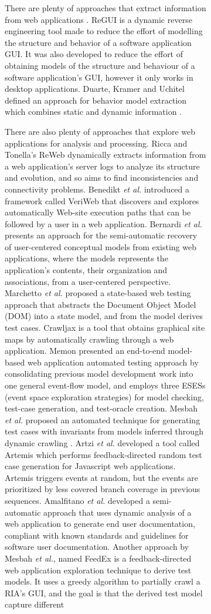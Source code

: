 \documentclass[conference]{IEEEtran}
\begin{document}
\begin{enumerate}
\begin{figure}[!htb]
\begin{itemize}
\begin{figure}[!htb]
\begin{itemize}
There are plenty of approaches that extract information from web applications \cite{sampath2007applying,amalfitano2010rich, andjelkovic2011trace,5556690,conf/fmics/PaivaFM07}. ReGUI \cite{coimbra2011reverse,coimbra2012dynamic} is a dynamic reverse engineering tool made to reduce the effort of modelling the structure and behavior of a software application GUI. It was also developed to reduce the effort of obtaining models of the structure and behaviour of a software application's GUI, however it only works in desktop applications.
Duarte, Kramer and Uchitel defined an approach for behavior model extraction which combines static and dynamic information \cite{duarte2006model}.

There are also plenty of approaches that explore web applications for analysis and processing. Ricca and Tonella's ReWeb \cite{ricca2001understanding} dynamically extracts information from a web application's server logs to analyze its structure and evolution, and so aims to find inconsistencies and connectivity problems. Benedikt \textit{et al.} introduced a framework called VeriWeb \cite{benedikt2002veriWeb} that discovers and explores automatically Web-site execution paths that can be followed by a user in a web application. Bernardi \textit{et al.} \cite{bernardi2008reverse} presents an approach for the semi-automatic recovery of user-centered conceptual models from existing web applications, where the models represents the application's contents, their organization and associations, from a user-centered perspective. Marchetto \textit{et al.} proposed a state-based web testing approach \cite{marchetto2008state} that abstracts the Document Object Model (DOM) into a state model, and from the model derives test cases. Crawljax \cite{roest2010automated} is a tool that obtains graphical site maps by automatically crawling through a web application. Memon presented an end-to-end model-based web application automated testing approach \cite{memon2007event} by consolidating previous model development work into one general event-flow model, and employs three ESESs (event space exploration strategies) for model checking, test-case generation, and test-oracle creation. Mesbah \textit{et al.} proposed an automated technique for generating test cases with invariants from models inferred through dynamic crawling \cite{mesbah2012invariant}. Artzi \textit{et al.} developed a tool called Artemis \cite{artzi2011framework} which performs feedback-directed random test case generation for Javascript web applications. Artemis triggers events at random, but the events are prioritized by less covered branch coverage in previous sequences. Amalfitano \textit{et al.} developed a semi-automatic approach \cite{amalfitano2011using} that uses dynamic analysis of a web application to generate end user documentation, compliant with known standards and guidelines for software user documentation. Another approach by Mesbah \textit{et al.}, named FeedEx \cite{fard2013feedback} is a feedback-directed web application exploration technique to derive test models. It uses a greedy algorithm to partially crawl a RIA's GUI, and the goal is that the derived test model capture different 
\end{itemize}
\end{figure}
\end{itemize}
\end{figure}
\end{enumerate}
\end{document}
